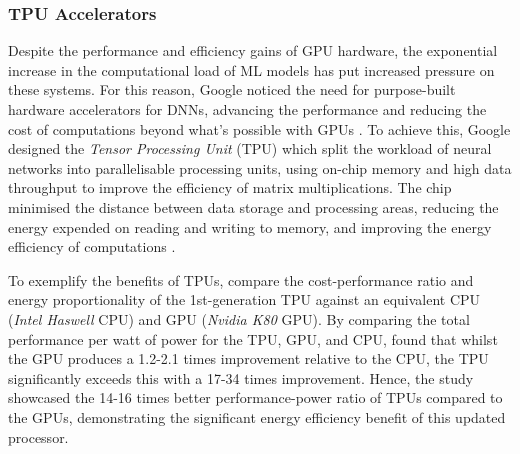 \documentclass[a4paper, 12pt]{article}
\begin{document}
    \subsubsection{TPU Accelerators}

    Despite the performance and efficiency gains of GPU hardware, the exponential increase in the computational load of ML models has put increased pressure on these systems. For this reason, Google noticed the need for purpose-built hardware accelerators for DNNs, advancing the performance and reducing the cost of computations beyond what's possible with GPUs \cite{jouppi-2017}. To achieve this, Google designed the \emph{Tensor Processing Unit} (TPU) which split the workload of neural networks into parallelisable processing units, using on-chip memory and high data throughput to improve the efficiency of matrix multiplications. The chip minimised the distance between data storage and processing areas, reducing the energy expended on reading and writing to memory, and improving the energy efficiency of computations \cite{kumar-2020}.

    To exemplify the benefits of TPUs,  compare the cost-performance ratio and energy proportionality of the 1st-generation TPU against an equivalent CPU (\emph{Intel Haswell} CPU) and GPU (\emph{Nvidia K80} GPU). By comparing the total performance per watt of power for the TPU, GPU, and CPU,  found that whilst the GPU produces a 1.2-2.1 times improvement relative to the CPU, the TPU significantly exceeds this with a 17-34 times improvement. Hence, the study showcased the 14-16 times better performance-power ratio of TPUs compared to the GPUs, demonstrating the significant energy efficiency benefit of this updated processor.
\end{document}

